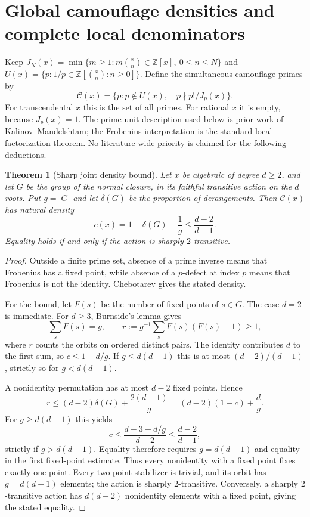 \documentclass[11pt,a4paper]{article}
\newtheorem{theorem}{Theorem}[section]
\theoremstyle{definition}
\theoremstyle{remark}
\theoremstyle{plain}
\numberwithin{equation}{section}
\begin{document}
\section{Global camouflage densities and complete local denominators}
\label{sc:sec:global-arithmetic}

Keep
$J_N(x)=\min\{m\ge1:m\binom xn\in\mathbb Z[x],\ 0\le n\le N\}$
and $U(x)=\{p:1/p\in\mathbb Z[\binom xn:n\ge0]\}$.
Define the simultaneous camouflage primes by
\[
\mathcal C(x)=\{p:p\notin U(x),\quad p\nmid p!/J_p(x)\}.
\]
For transcendental $x$ this is the set of all primes.  For rational
$x$ it is empty, because $J_p(x)=1$.  The prime-unit description
used below is prior work of
\href{https://arxiv.org/abs/2010.14494}{Kalinov--Mandelshtam}; the
Frobenius interpretation is the standard local factorization theorem.
No literature-wide priority is claimed for the following deductions.

\begin{theorem}[Sharp joint density bound]\label{sc:thm:joint-density}
Let $x$ be algebraic of degree $d\ge2$, and let $G$ be the group
of the normal closure, in its faithful transitive action on the
$d$ roots.  Put $g=|G|$ and let $\delta(G)$ be the proportion of
derangements.  Then $\mathcal C(x)$ has natural density
\[
 c(x)=1-\delta(G)-\frac1g\le\frac{d-2}{d-1}.
\]
Equality holds if and only if the action is sharply $2$-transitive.
\end{theorem}
\begin{proof}
Outside a finite prime set, absence of a prime inverse means that
Frobenius has a fixed point, while absence of a $p$-defect at index
$p$ means that Frobenius is not the identity.  Chebotarev gives the
stated density.

For the bound, let $F(s)$ be the number of fixed points of $s\in G$.
The case $d=2$ is immediate.  For $d\ge3$, Burnside's lemma gives
\[
 \sum_sF(s)=g,\qquad
 r:=g^{-1}\sum_sF(s)(F(s)-1)\ge1,
\]
where $r$ counts the orbits on ordered distinct pairs.  The identity
contributes $d$ to the first sum, so $c\le1-d/g$.  If
$g\le d(d-1)$ this is at most $(d-2)/(d-1)$, strictly so for
$g<d(d-1)$.

A nonidentity permutation has at most $d-2$ fixed points.  Hence
\[
 r\le(d-2)\delta(G)+\frac{2(d-1)}g
   =(d-2)(1-c)+\frac dg.
\]
For $g\ge d(d-1)$ this yields
\[
 c\le\frac{d-3+d/g}{d-2}\le\frac{d-2}{d-1},
\]
strictly if $g>d(d-1)$.  Equality therefore requires $g=d(d-1)$
and equality in the first fixed-point estimate.  Thus every
nonidentity with a fixed point fixes exactly one point.  Every
two-point stabilizer is trivial, and its orbit has $g=d(d-1)$
elements; the action is sharply $2$-transitive.  Conversely, a
sharply $2$-transitive action has $d(d-2)$ nonidentity elements
with a fixed point, giving the stated equality.
\end{proof}
\end{document}
